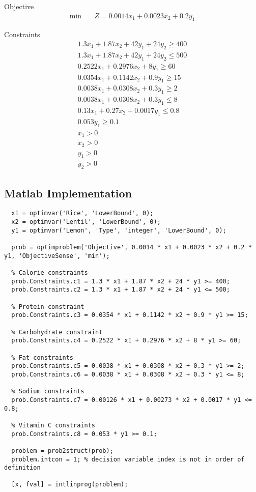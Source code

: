 \documentclass[
]{article}
\begin{document}
Objective
\begin{align}
	\min \quad
	  & Z  = 0.0014x_1 + 0.0023x_2 + 0.2y_1 
\end{align}

Constraints
\begin{align}
	1.3x_1 + 1.87x_2 + 42y_1 + 24y_2 \ge 400 \\
	1.3x_1 + 1.87x_2 + 42y_1 + 24y_2 \le 500 \\
	0.2522x_1 + 0.2976x_2 + 8y_1 \ge 60      \\
	0.0354x_1 + 0.1142x_2 + 0.9y_1 \ge 15    \\
	0.0038x_1 + 0.0308x_2 + 0.3y_1  \ge 2    \\
	0.0038x_1 + 0.0308x_2 + 0.3y_1 \le 8     \\
	0.13x_1 + 0.27x_2 + 0.0017y_1 \le 0.8    \\
	0.053y_1 \ge 0.1                         \\
	x_1 > 0                                  \\
	x_2 > 0                                  \\
	y_1 > 0                                  \\
	y_2 > 0                                  
\end{align}
\setcounter{equation}{0}

\newpage
\hypertarget{matlab-implementation-1}{%
	\subsection{Matlab Implementation}\label{matlab-implementation-1}}

\begin{lstlisting}
  x1 = optimvar('Rice', 'LowerBound', 0);
  x2 = optimvar('Lentil', 'LowerBound', 0);
  y1 = optimvar('Lemon', 'Type', 'integer', 'LowerBound', 0);
  
  prob = optimproblem('Objective', 0.0014 * x1 + 0.0023 * x2 + 0.2 * y1, 'ObjectiveSense', 'min');
  
  % Calorie constraints
  prob.Constraints.c1 = 1.3 * x1 + 1.87 * x2 + 24 * y1 >= 400;
  prob.Constraints.c2 = 1.3 * x1 + 1.87 * x2 + 24 * y1 <= 500;
  
  % Protein constraint
  prob.Constraints.c3 = 0.0354 * x1 + 0.1142 * x2 + 0.9 * y1 >= 15;
  
  % Carbohydrate constraint
  prob.Constraints.c4 = 0.2522 * x1 + 0.2976 * x2 + 8 * y1 >= 60;
  
  % Fat constraints
  prob.Constraints.c5 = 0.0038 * x1 + 0.0308 * x2 + 0.3 * y1 >= 2;
  prob.Constraints.c6 = 0.0038 * x1 + 0.0308 * x2 + 0.3 * y1 <= 8;
  
  % Sodium constraints
  prob.Constraints.c7 = 0.00126 * x1 + 0.00273 * x2 + 0.0017 * y1 <= 0.8;
  
  % Vitamin C constraints
  prob.Constraints.c8 = 0.053 * y1 >= 0.1;
  
  problem = prob2struct(prob);
  problem.intcon = 1; % decision variable index is not in order of definition
  
  [x, fval] = intlinprog(problem);
\end{lstlisting}
\end{document}
